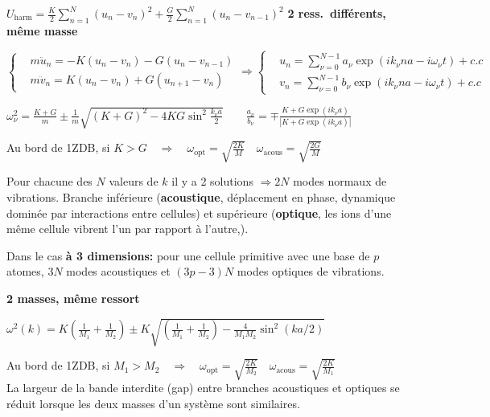 \begin{squishlist}
    \item $U_{\text{harm}} = \frac{K}{2}\sum_{n=1}^{N}(u_n - v_n)^2 + \frac{G}{2} \sum_{n=1}^{N} (u_n - v_{n-1})^2$ \quad \textbf{2 ress.\ différents, même masse}
    \item $\left\{ \begin{aligned}
        & m\ddot{u}_n = -K (u_n - v_n) - G(u_n - v_{n-1}) \\
        & m\ddot{v}_n = K (u_n - v_n) + G(u_{n+1} - v_{n})
    \end{aligned}\right.
    \Rightarrow 
    \left\{ \begin{aligned}
        & u_n = \sum_{\nu = 0}^{N-1} a_{\nu} \exp (i k_{\nu}na - i\omega_{\nu}t) + c.c \\
        & v_n = \sum_{\nu = 0}^{N-1} b_{\nu} \exp (i k_{\nu}na - i\omega_{\nu}t) + c.c
    \end{aligned}\right.$

    \item $\omega_{\nu}^2 = \frac{K+G}{m} \pm \frac{1}{m}\sqrt{(K+G)^2 - 4KG \sin^2 \frac{k_{\nu}a}{2}} \qquad \frac{a_{\nu}}{b_{\nu}} = \mp \frac{K + G\exp(ik_{\nu}a)}{|K + G\exp(ik_{\nu}a)|}$
    \item Au bord de 1ZDB, si $K > G \quad \Longrightarrow \quad \omega_{\text{opt}}= \sqrt{\frac{2K}{M}} \quad \omega_{\text{acous}} = \sqrt{\frac{2G}{M}}$ \\
    \item Pour chacune des $N$ valeurs de $k$ il y a 2 solutions $\Rightarrow 2N$ modes normaux de vibrations. Branche inférieure (\textbf{acoustique}, déplacement en phase, dynamique dominée par interactions entre cellules) et supérieure (\textbf{optique}, les ions d’une même cellule vibrent l’un par rapport à l’autre,).
    \item Dans le cas \textbf{à 3 dimensions:} pour une cellule primitive avec une base de $p$ atomes, $3N$ modes acoustiques et $(3p - 3)N$ modes optiques de vibrations.
    
    \squishline

    \textbf{2 masses, même ressort}
    \item $\omega^2(k) = K \left(\frac{1}{M_1}+\frac{1}{M_2}\right) \pm K \sqrt{\left(\frac{1}{M_1}+\frac{1}{M_2}\right) - \frac{4}{M_1 M_2} \sin^2(ka/2)}$
    \item Au bord de 1ZDB, si $M_1 > M_2 \quad \Longrightarrow \quad \omega_{\text{opt}}= \sqrt{\frac{2K}{M_2}} \quad \omega_{\text{acous}} = \sqrt{\frac{2K}{M_1}}$ \\
    La largeur de la bande interdite (gap) entre branches acoustiques et optiques se réduit lorsque les deux masses d’un système sont similaires.
\end{squishlist}

